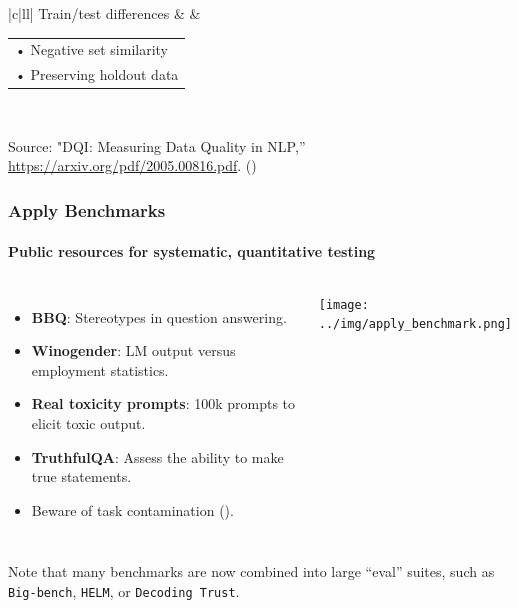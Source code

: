 \documentclass[11pt,
               aspectratio=169,
               hyperref={colorlinks}
               ]{beamer}
\begin{document}
\begin{frame}[t]
\begin{table}[]
\begin{tabular}{|c|ll|}
			Train/test differences &  & \begin{tabular}[c]{@{}l@{}}• Negative set similarity \\ • Preserving holdout data\end{tabular}  \\ \hline
			\end{tabular}
			\end{table}
	
			\centering
			\scriptsize{Source: "DQI: Measuring Data Quality in NLP,”\\\url{https://arxiv.org/pdf/2005.00816.pdf}. (\cite{mishra2020dqi})}
	
	
		\end{frame}
		
		\begin{frame}
			
			\frametitle{Apply Benchmarks}
			\framesubtitle{Public resources for systematic, quantitative testing}
			
			\begin{columns}
				
				\vspace{-5pt}
				\begin{itemize}\small
					\item \textbf{BBQ}: Stereotypes in question answering.
					\item \textbf{Winogender}: LM output versus employment statistics.
					\item \textbf{Real toxicity prompts}: 100k prompts to elicit toxic output.
					\item \textbf{TruthfulQA}: Assess the ability to make true statements.
					\item Beware of task contamination (\cite{li2024task}). 
				\end{itemize}
				\centering
				\newline  \newline  \newline
				\texttt{[image: ../img/apply\_benchmark.png]} 
		
			\end{columns}
			\vspace{10pt}
			\small{Note that many benchmarks are now combined into large ``eval'' suites, such as \texttt{Big-bench}, \texttt{HELM}, or \texttt{Decoding Trust}}.
					
		\end{frame}
		
\end{document}
